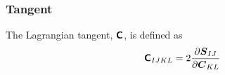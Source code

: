 \documentclass[10pt,letterpaper,oneside]{report}
\newcommand{\ten}[1]{\mbox{\boldmath $#1$}{}}
\newcommand{\tenf}[1]{\mbox{{\sffamily{\bfseries {#1}}}}}
\begin{document}
\subsubsection{Tangent}
The Lagrangian tangent, $\tenf{C}$, is defined as
\begin{align}
\tenf{C}_{IJKL} ={}& 2 \frac{\partial \ten{S}_{IJ} }{\partial \ten{C}_{KL} }  
\\

\end{align}
\end{document}
